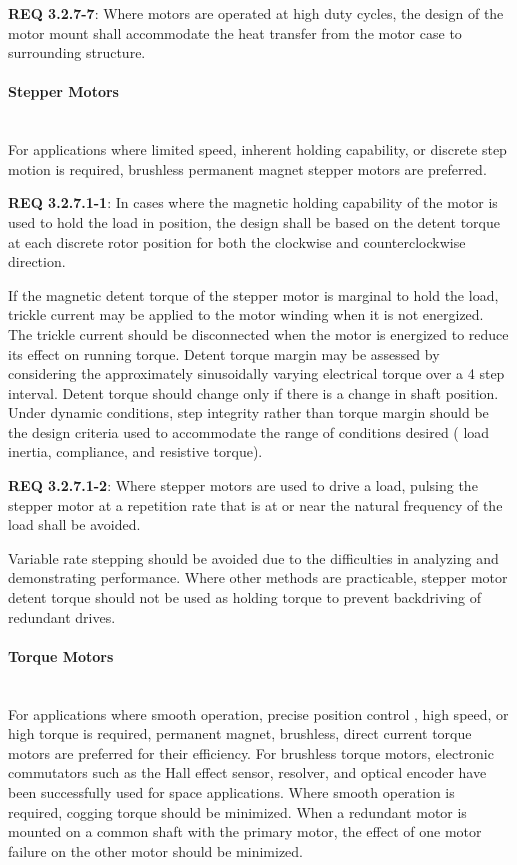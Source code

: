 \documentclass[12pt]{article}
\begin{document}
\noindent \textbf{REQ 3.2.7-7}: Where motors are operated at high duty cycles, the design of the motor mount shall accommodate the heat transfer from the motor case to surrounding structure.


\paragraph{Stepper Motors} \mbox{} \\ %
For applications where limited speed, inherent holding capability, or discrete step motion is required, brushless permanent magnet stepper motors are preferred. 

\noindent \textbf{REQ 3.2.7.1-1}: In cases where the magnetic holding capability of the motor is used to hold the load in position, the design shall be based on the detent torque at each discrete rotor position for both the clockwise and counterclockwise direction. 

If the magnetic detent torque of the stepper motor is marginal to hold the load, trickle current may be applied to the motor winding when it is not energized. 
The trickle current should be disconnected when the motor is energized to reduce its effect on running torque. 
Detent torque margin may be assessed by considering the approximately sinusoidally varying electrical torque over a 4 step interval. 
Detent torque should change only if there is a change in shaft position.
Under dynamic conditions, step integrity rather than torque margin should be the design criteria used to accommodate the range of conditions desired ( load inertia, compliance, and resistive torque). 

\noindent \textbf{REQ 3.2.7.1-2}: Where stepper motors are used to drive a load, pulsing the stepper motor at a repetition rate that is at or near the natural frequency of the load shall be avoided. 

Variable rate stepping should be avoided due to the difficulties in analyzing and demonstrating performance. 
Where other methods are practicable, stepper motor detent torque should not be used as holding torque to prevent backdriving of redundant drives.


\paragraph{Torque Motors} \mbox{} \\ %
For applications where smooth operation, precise position control , high speed, or high torque is required, permanent magnet, brushless, direct current torque motors are preferred for their efficiency. 
For brushless torque motors, electronic commutators such as the Hall effect sensor, resolver, and optical encoder have been successfully used for space applications. 
Where smooth operation is required, cogging torque should be minimized. 
When a redundant motor is mounted on a common shaft with the primary motor, the effect of one motor failure on the other motor should be minimized.
\end{document}
